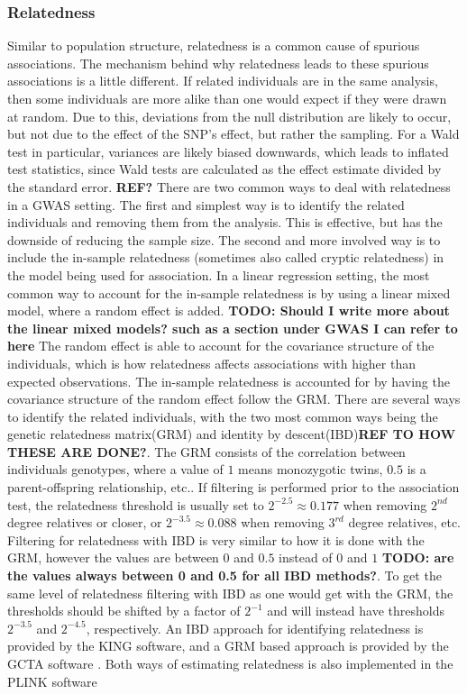 \subsubsection{Relatedness}
Similar to population structure, relatedness is a common cause of spurious associations. The mechanism behind why relatedness leads to these spurious associations is a little different. If related individuals are in the same analysis, then some individuals are more alike than one would expect if they were drawn at random. Due to this, deviations from the null distribution are likely to occur, but not due to the effect of the SNP's effect, but rather the sampling. For a Wald test in particular, variances are likely biased downwards, which leads to inflated test statistics, since Wald tests are calculated as the effect estimate divided by the standard error. \textbf{REF?}
There are two common ways to deal with relatedness in a GWAS setting. The first and simplest way is to identify the related individuals and removing them from the analysis. This is effective, but has the downside of reducing the sample size. The second and more involved way is to include the in-sample relatedness (sometimes also called cryptic relatedness) in the model being used for association. In a linear regression setting, the most common way to account for the in-sample relatedness is by using a linear mixed model, where a random effect is added. \textbf{TODO: Should I write more about the linear mixed models? such as a section under GWAS I can refer to here} The random effect is able to account for the covariance structure of the individuals, which is how relatedness affects associations with higher than expected observations\cite{yu2006unified, kang2008efficient}. The in-sample relatedness is accounted for by having the covariance structure of the random effect follow the GRM.
There are several ways to identify the related individuals, with the two most common ways being the genetic relatedness matrix(GRM) and identity by descent(IBD)\textbf{REF TO HOW THESE ARE DONE?}. The GRM consists of the correlation between individuals genotypes, where a value of $ 1 $ means monozygotic twins, $ 0.5 $ is a parent-offspring relationship, etc.. If filtering is performed prior to the association test, the relatedness threshold is usually set to $ 2^{-2.5} \approx 0.177 $ when removing $ 2^{nd} $ degree relatives or closer, or $ 2^{-3.5} \approx 0.088 $ when removing $ 3^{rd} $ degree relatives, etc. Filtering for relatedness with IBD is very similar to how it is done with the GRM, however the values are between $ 0 $ and $ 0.5 $ instead of $ 0 $ and $ 1 $ \textbf{TODO: are the values always between 0 and 0.5 for all IBD methods?}. To get the same level of relatedness filtering with IBD as one would get with the GRM, the thresholds should be shifted by a factor of $ 2^{-1} $ and will instead have thresholds $ 2^{-3.5} $ and $ 2^{-4.5} $, respectively. An IBD approach for identifying relatedness is provided by the KING software\cite{manichaikul2010robust}, and a GRM based approach is provided by the GCTA software \cite{yang2011gcta}. Both ways of estimating relatedness is also implemented in the PLINK software\cite{chang2015second,purcell2007plink}


